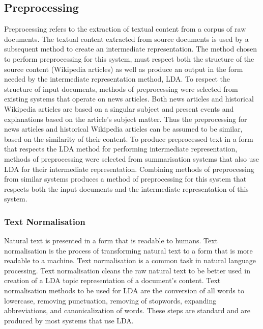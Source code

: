 \subsection{Preprocessing}
\label{subsec:3.5.2}
Preprocessing refers to the extraction of textual content from a corpus of raw documents. The textual content extracted from source documents is used by a subsequent method to create an intermediate representation. The method chosen to perform preprocessing for this system, must respect both the structure of the source content (Wikipedia articles) as well as produce an output in the form needed by the intermediate representation method, LDA. To respect the structure of input documents, methods of preprocessing were selected from existing systems that operate on news articles. Both news articles and historical Wikipedia articles are based on a singular subject and present events and explanations based on the article’s subject matter. Thus the preprocessing for news articles and historical Wikipedia articles can be assumed to be similar, based on the similarity of their content.  To produce preprocessed text in a form that respects the LDA method for performing intermediate representation, methods of preprocessing were selected from summarisation systems that also use LDA for their intermediate representation. Combining methods of preprocessing from similar systems produces a method of preprocessing for this system that respects both the input documents and the intermediate representation of this system.

\subsubsection{Text Normalisation}
Natural text is presented in a form that is readable to humans. Text normalisation is the process of transforming natural text to a form that is more readable to a machine. Text normalisation is a common task in natural language processing. Text normalisation cleans the raw natural text to be better used in creation of a LDA topic representation of a document's content. Text normalisation methods to be used for LDA are the conversion of all words to lowercase, removing punctuation, removing of stopwords, expanding abbreviations, and canonicalization of words. These steps are standard and are produced by most systems that use LDA.

